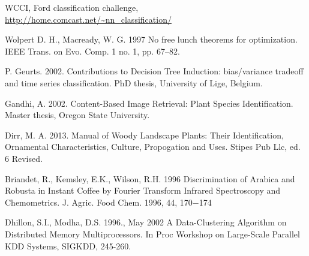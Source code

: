 \documentclass{llncs}
\begin{document}
\begin{thebibliography}{5}
WCCI, Ford classification challenge, \url{http://home.comcast.net/~nn_classification/}

Wolpert D. H., Macready, W. G. 1997
No free lunch theorems for optimization.
IEEE Trans. on Evo. Comp. 1 no. 1, pp. 67--82.

P. Geurts. 2002.
Contributions to Decision Tree Induction: bias/variance tradeoﬀ and time series classiﬁcation.
PhD thesis, University of Lige, Belgium.

Gandhi, A. 2002.
Content-Based Image Retrieval: Plant Species Identification. 
Master thesis, Oregon State University.

Dirr, M. A. 2013.
Manual of Woody Landscape Plants: Their Identification, Ornamental Characteristics,
Culture, Propogation and Uses.
Stipes Pub Llc, ed. 6 Revised.

Briandet, R., Kemsley, E.K., Wilson, R.H. 1996
Discrimination of Arabica and Robusta in Instant Coffee by Fourier Transform Infrared Spectroscopy
and Chemometrics.
J. Agric. Food Chem. 1996, 44, 170−174

Dhillon, S.I., Modha, D.S. 1996., May 2002
A Data-Clustering Algorithm on Distributed Memory Multiprocessors. 
In Proc Workshop on Large-Scale Parallel KDD Systems, SIGKDD, 245-260.

\end{thebibliography}

%
\end{document}
